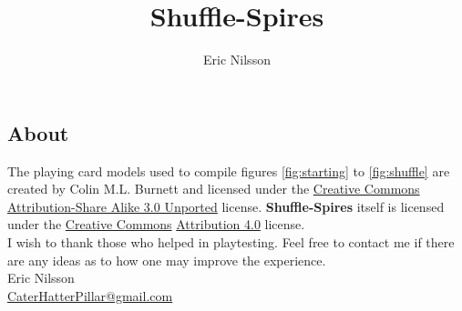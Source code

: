 \documentclass[11pt,twocolumn]{article}
\title{Shuffle-Spires}
\author{Eric Nilsson}
\date{}
\begin{document}
\maketitle







\subsection{About}
\label{sec:about}
The playing card models used to compile figures \ref{fig:starting} to \ref{fig:shuffle} are created by Colin M.L. Burnett and licensed under the \href{http://en.wikipedia.org/wiki/en:Creative_Commons}{Creative Commons} \href{http://creativecommons.org/licenses/by-sa/3.0/deed.en}{Attribution-Share Alike 3.0 Unported} license.
\textbf{Shuffle-Spires} itself is licensed under the \href{http://en.wikipedia.org/wiki/en:Creative_Commons}{Creative Commons} \href{http://creativecommons.org/licenses/by/4.0/}{Attribution 4.0} license.\\

\noindent
I wish to thank those who helped in playtesting.
Feel free to contact me if there are any ideas as to how one may improve the experience.\\

\noindent
Eric Nilsson \\
\href{mailto:CaterHatterPillar@gmail.com}{CaterHatterPillar@gmail.com}
\end{document}
